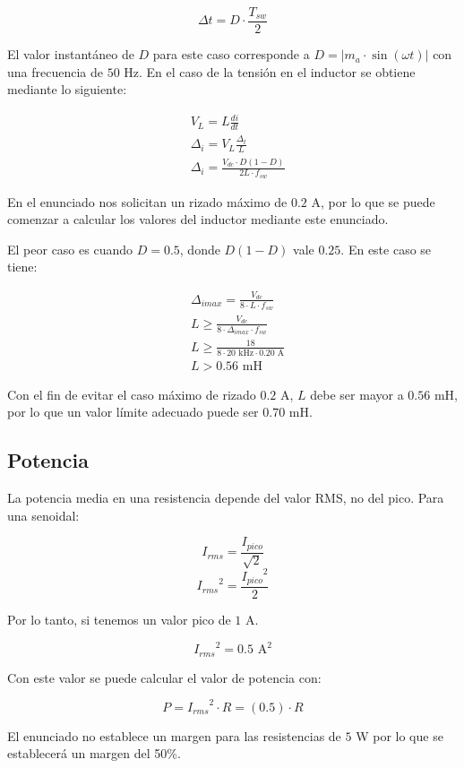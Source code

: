 \documentclass[spanish,10pt,a4paper,titlepage]{article}
\begin{document}
	\[\Delta t =  D \cdot \frac{T_{sw}}{2}\]
	
	El valor instantáneo de $D$ para este caso corresponde a $D = |m_a \cdot \sin(\omega t)|$ con una frecuencia de $50$ Hz. En el caso de la tensión en el inductor se obtiene mediante lo siguiente:

	\begin{align*}
		&V_L = L \frac{di}{dt}\\
		&\Delta_i = V_L \frac{\Delta_t}{L} \\
		&\Delta_i = \frac{V_{dc} \cdot D(1-D) }{2L\cdot f_{sw}}
	\end{align*}
	
	En el enunciado nos solicitan un rizado máximo de $0.2$ A, por lo que se puede comenzar a calcular los valores del inductor mediante este enunciado.
	
	El peor caso es cuando $D = 0.5$, donde $D(1-D)$ vale $0.25$. En este caso se tiene:
	
	\begin{align*}
		&\Delta_{imax} = \frac{V_{dc}}{8 \cdot L \cdot f_{sw}}\\
		&L \geq \frac{V_{dc}}{8 \cdot \Delta_{imax} \cdot f_{sw}}\\
		&L \geq \frac{18}{8 \cdot 20\text{ kHz} \cdot 0.20 \text{ A}}\\
		&L > 0.56 \text{ mH}
	\end{align*}
	
	Con el fin de evitar el caso máximo de rizado $0.2$ A, $L$ debe ser mayor a $0.56$ mH, por lo que un valor límite adecuado puede ser $0.70$ mH.
	
	\subsection{Potencia}
	 La potencia media en una resistencia depende del valor RMS, no del pico. Para una senoidal:
	 
	 \[I_{rms} = \frac{I_{pico}}{\sqrt{2}}\]
	 \[{I_{rms}}^2 = \frac{{I_{pico}}^2}{2}\]
	 
	 Por lo tanto, si tenemos un valor pico de $1$ A.
	 
	\[{I_{rms}}^2 = 0.5 \text{ A}^2\]
	
	Con este valor se puede calcular el valor de potencia con: 
	
	\[P = {I_{rms}}^2\cdot R = (0.5)\cdot R \]
	
	El enunciado no establece un margen para las resistencias de $5$ W por lo que se establecerá un margen del 50\%.
	
\end{document}
